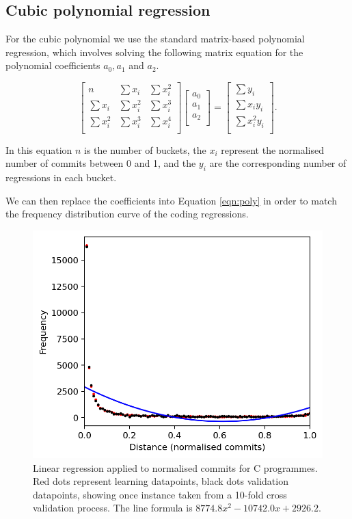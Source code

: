 \documentclass[pdflatex, sn-mathphys, referee]{sn-jnl}%
\theoremstyle{thmstyleone}%
\theoremstyle{thmstyletwo}%
\theoremstyle{thmstylethree}%
\theoremstyle{thmstyleone}
\begin{document}
\subsection{Cubic polynomial regression}

For the cubic polynomial we use the standard matrix-based polynomial regression, which involves solving the following matrix equation for the polynomial coefficients $a_0, a_1$ and $a_2$.

\begin{equation}
\begin{bmatrix}
n          & \sum x_i   & \sum x_i^2 \\
\sum x_i   & \sum x_i^2 & \sum x_i^3 \\
\sum x_i^2 & \sum x_i^3 & \sum x_i^4 \\
\end{bmatrix}
\begin{bmatrix}
a_0 \\
a_1 \\
a_2 \\
\end{bmatrix}
=
\begin{bmatrix}
\sum y_i \phantom{x_i} \\
\sum x_i y_i           \\
\sum x_i^2 y_i         \\
\end{bmatrix}.
\end{equation}

In this equation $n$ is the number of buckets, the $x_i$ represent the normalised number of commits between 0 and 1, and the $y_i$ are the corresponding number of regressions in each bucket.

We can then replace the coefficients into Equation \ref{eqn:poly} in order to match the frequency distribution curve of the coding regressions.

\begin{figure}[t]
\centering
\includegraphics[width=0.7\columnwidth]{Fig4}%
\caption{\label{fig:c-linear}Linear regression applied to normalised commits for C programmes. Red dots represent learning datapoints, black dots validation datapoints, showing once instance taken from a 10-fold cross validation process. The line formula is $8774.8 x^{2} - 10742.0 x + 2926.2$.}
\end{figure}
\end{document}
